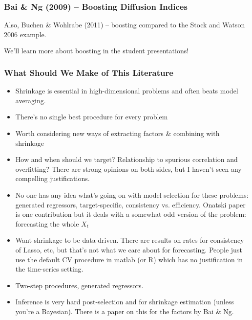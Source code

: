 \documentclass[handout]{beamer}
\begin{document}
\begin{frame}[c]\frametitle{Bai \& Ng (2009) -- Boosting Diffusion Indices}
    
Also, Buchen \& Wohlrabe (2011) -- boosting compared to the Stock and Watson 2006 example.

We'll learn more about boosting in the student presentations!
\end{frame}
\begin{frame}[c]\frametitle{What Should We Make of This Literature}
    \footnotesize
\begin{itemize}
	\item Shrinkage is essential in high-dimensional problems and often beats model averaging.
	\item There's no single best procedure for every problem
	\item Worth considering new ways of extracting factors \& combining with shrinkage
	\item How and when should we target? Relationship to spurious correlation and overfitting? There are strong opinions on both sides, but I haven't seen any compelling justifications.
	\item No one has any idea what's going on with model selection for these problems: generated regressors, target-specific, consistency vs. efficiency. Onatski paper is one contribution but it deals with a somewhat odd version of the problem: forecasting the whole $X_t$
	\item Want shrinkage to be data-driven. There are results on rates for consistency of Lasso, etc, but that's not what we care about for forecasting. People just use the default CV procedure in matlab (or R) which has no justification in the time-series setting. 
	\item Two-step procedures, generated regressors.
	\item Inference is very hard post-selection and for shrinkage estimation (unless you're a Bayesian). There is a paper on this for the factors by Bai \& Ng.
\end{itemize}

\end{frame}
\end{document}
